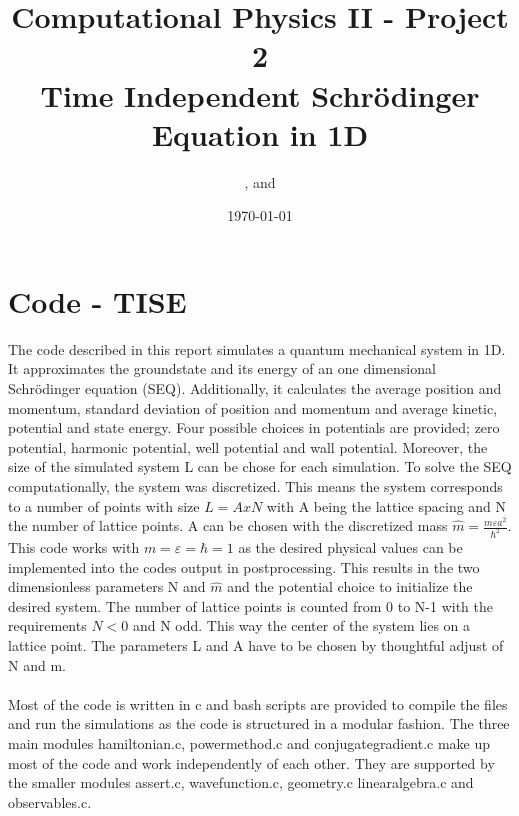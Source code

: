 \documentclass{article}
\title{Computational Physics II - Project 2 \\ Time Independent Schrödinger Equation in 1D}
\author{\aone\space, \atwo\space and \athree \\ \afour}
\date{\today}
\begin{document}
\maketitle
\tableofcontents
\begin{abstract}
 
\end{abstract}

\section{Code - TISE}\label{code}
The code described in this report simulates a quantum mechanical system in 1D. It approximates the groundstate and its energy of an one dimensional Schr\"{o}dinger equation (SEQ). 
Additionally, it calculates the average position and momentum, standard deviation of position and momentum and average kinetic, potential and state energy. 
Four possible choices in potentials are provided; zero potential, harmonic potential, well potential and wall potential. Moreover, the size of the simulated system L can be chose for each simulation. 
To solve the SEQ computationally, the system was discretized. 
This means the system corresponds to a number of points with size $L = AxN$ with A being the lattice spacing and N the number of lattice points. A can be chosen with the discretized mass $\hat{m} = \frac{m \varepsilon a^2}{\hbar^2}$. 
This code works with $m = \varepsilon = \hbar = 1$ as the desired physical values can be implemented into the codes output in postprocessing.
This results in the two dimensionless parameters N and $\hat{m}$ and the potential choice to initialize the desired system. 
The number of lattice points is counted from 0 to N-1 with the requirements $N<0$ and N odd. 
This way the center of the system lies on a lattice point.
The parameters L and A have to be chosen by thoughtful adjust of N and m. \\
\\
Most of the code is written in c and bash scripts are provided to compile the files and run the simulations as the code is structured in a modular fashion.
The three main modules {\selectfont hamiltonian.c, powermethod.c} and {\selectfont conjugategradient.c} make up most of the code and work independently of each other. They are supported by the smaller modules {\selectfont assert.c, wavefunction.c, geometry.c linearalgebra.c} and {\selectfont observables.c}.\\
\end{document}
